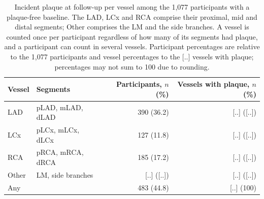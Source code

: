 \begin{table}[htbp]
  \centering
  \caption{Incident plaque at follow-up per vessel among the 1,077 participants with a plaque-free baseline. The LAD, LCx and RCA comprise their proximal, mid and distal segments; Other comprises the LM and the side branches. A vessel is counted once per participant regardless of how many of its segments had plaque, and a participant can count in several vessels. Participant percentages are relative to the 1,077 participants and vessel percentages to the [..] vessels with plaque; percentages may not sum to 100 due to rounding.}
  \label{tab:results-plaque-location}
  \small
  \begin{tabular}{llrr}
    \toprule
    Vessel & Segments & Participants, $n$ (\%) & Vessels with plaque, $n$ (\%) \\
    \midrule
    LAD & pLAD, mLAD, dLAD & 390 (36.2) & [..] ([..]) \\
    LCx & pLCx, mLCx, dLCx & 127 (11.8) & [..] ([..]) \\
    RCA & pRCA, mRCA, dRCA & 185 (17.2) & [..] ([..]) \\
    Other & LM, side branches & [..] ([..]) & [..] ([..]) \\
    \midrule
    Any & & 483 (44.8) & [..] (100) \\
    \bottomrule
  \end{tabular}
\end{table}

